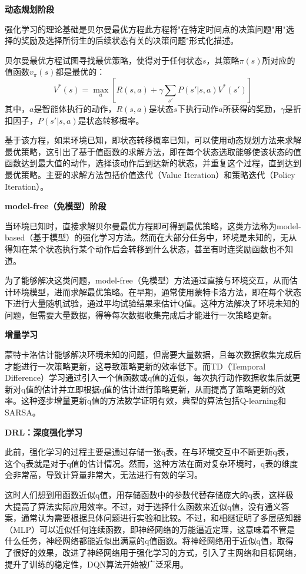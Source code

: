 \documentclass[12pt,a4paper,UTF8]{ctexart}
\numberwithin{equation}{section}
\begin{document}
\textbf{动态规划阶段}

强化学习的理论基础是贝尔曼最优方程\cite{bellman1957dynamic}此方程将"在特定时间点的决策问题"用"选择的奖励及选择所衍生的后续状态有关的决策问题"形式化描述。

贝尔曼最优方程试图寻找最优策略，使得对于任何状态$s$，其策略$\pi(s)$所对应的值函数$v_\pi(s)$都是最优的：
\begin{equation}
    V^{*}(s) = \max_a \left[ R(s, a) + \gamma \sum_{s'} P(s'|s, a) V^{*}(s') \right]
    \label{eq:bellman_optimal_equation}
\end{equation}
其中，$a$是智能体执行的动作，$R(s, a)$是状态$s$下执行动作$a$所获得的奖励，$\gamma$是折扣因子，$P(s'|s, a)$是状态转移概率。

基于该方程，如果环境已知，即状态转移概率已知，可以使用动态规划方法来求解最优策略，这引出了基于值函数的求解方法，即在每个状态选取能够使该状态的值函数达到最大值的动作，选择该动作后到达新的状态，并重复这个过程，直到达到最优策略。主要的求解方法包括价值迭代（Value Iteration）和策略迭代（Policy Iteration）。

\textbf{model-free（免模型）阶段}

当环境已知时，直接求解贝尔曼最优方程即可得到最优策略，这类方法称为model-based（基于模型）的强化学习方法。然而在大部分任务中，环境是未知的，无从得知在某个状态执行某个动作后会转移到什么状态，甚至有时连奖励函数也不知道。

为了能够解决这类问题，model-free（免模型）方法通过直接与环境交互，从而估计环境模型，进而求解最优策略。在早期，通常使用蒙特卡洛方法，即在每个状态下进行大量随机试验，通过平均试验结果来估计Q值。这种方法解决了环境未知的问题，但需要大量数据，得等每次数据收集完成后才能进行一次策略更新。

\textbf{增量学习}

蒙特卡洛估计能够解决环境未知的问题，但需要大量数据，且每次数据收集完成后才能进行一次策略更新，这导致策略更新的效率低下。而TD（Temporal Difference）学习\cite{sutton1988learning}通过引入一个值函数或q值的近似，每次执行动作数据收集后就更新对q值的估计并立即根据q值的估计进行策略更新，从而提高了策略更新的效率。这种逐步增量更新q值的方法数学证明有效，典型的算法包括Q-learning和SARSA。

\textbf{DRL：深度强化学习}

此前，强化学习的过程主要是通过存储一张q表，在与环境交互中不断更新q表，这个q表就是对于q值的估计情况。然而，这种方法在面对复杂环境时，q表的维度会非常高，导致计算量非常大，无法进行有效的学习。

这时人们想到用函数近似q值，用存储函数中的参数代替存储庞大的q表，这样极大提高了算法实际应用效率。不过，对于选择什么函数来近似q值，没有通义答案，通常认为需要根据具体问题进行实验和比较。不过，\cite{cybenko1989approximation}和\cite{hornik1989multilayer}相继证明了多层感知器（MLP）可以近似任何连续函数，即神经网络的万能逼近定理，这意味着不管是什么任务，神经网络都能近似出满意的q值函数。\cite{mnih2013playingatarideepreinforcement}将神经网络用于近似q值，取得了很好的效果，\cite{mnih2015human}改进了神经网络用于强化学习的方式，引入了主网络和目标网络，提升了训练的稳定性，DQN算法开始被广泛采用。
\end{document}
